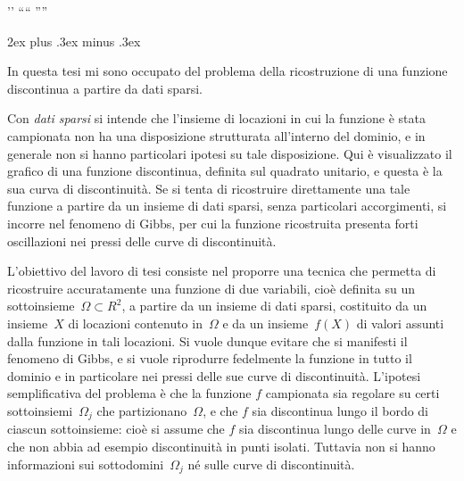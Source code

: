 \adef’{'}
\adef“{``}
\adef”{''}

\def\R{R}

\parindent 0pt
\parskip 2ex plus .3ex minus .3ex


\def\begitems{\_bgroup\_begitems\_parskip=1.5\lineskip \_removelastskip}
\def\enditems{\_enditems\par\vskip-\parskip\_egroup}
\def\_belowliskip{\_penalty -200 \vskip.2\baselineskip}


In questa tesi mi sono occupato del problema della ricostruzione di una funzione discontinua a partire da dati sparsi.

Con {\em dati sparsi} si intende che l'insieme di locazioni in cui la funzione è stata campionata non ha una disposizione strutturata all'interno del dominio, e in generale non si hanno particolari ipotesi su tale disposizione. 
Qui è visualizzato il grafico di una funzione discontinua, definita sul quadrato unitario, e questa è la sua curva di discontinuità.    Se si tenta di ricostruire direttamente una tale  funzione a partire da un insieme di dati sparsi, senza particolari accorgimenti, si incorre nel fenomeno di Gibbs, per cui la funzione ricostruita presenta forti oscillazioni nei pressi delle curve di discontinuità.   %



L'obiettivo del lavoro di tesi consiste nel proporre una tecnica che permetta di ricostruire accuratamente una funzione di due variabili, cioè definita su un sottoinsieme~$\Omega\subset\R^2$, a partire da un insieme di dati sparsi, costituito da un insieme~$X$ di locazioni contenuto in~$\Omega$ e da un insieme~$f(X)$ di valori assunti dalla funzione in tali locazioni.  Si vuole dunque evitare che si manifesti il fenomeno di Gibbs, e si vuole riprodurre fedelmente la funzione in tutto il dominio e in particolare nei pressi delle sue curve di discontinuità.  L'ipotesi semplificativa del problema è che la funzione $f$ campionata sia regolare su certi sottoinsiemi~$\Omega_j$ che partizionano~$\Omega$, e che $f$ sia discontinua lungo il bordo di ciascun sottoinsieme:  cioè si assume che $f$ sia discontinua lungo delle curve in~$\Omega$ e che non abbia ad esempio discontinuità in punti isolati.  Tuttavia non si hanno informazioni sui sottodomini~$\Omega_j$ né sulle curve di discontinuità.


